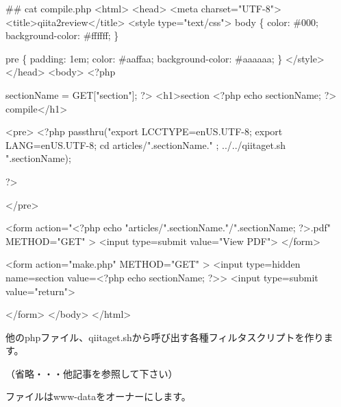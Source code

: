 \begin{reviewemlist}
\#\# cat compile.php
\textless{}html\textgreater{}
\textless{}head\textgreater{}
\textless{}meta charset="UTF{-}8"\textgreater{}
\textless{}title\textgreater{}qiita2review\textless{}/title\textgreater{}
\textless{}style type="text/css"\textgreater{}
body \{
  color: \#000;
  background{-}color: \#ffffff;
\}

pre \{
  padding: 1em;
  color: \#aaffaa;
  background{-}color: \#aaaaaa;
\}
\textless{}/style\textgreater{}
\textless{}/head\textgreater{}
\textless{}body\textgreater{}
\textless{}?php

\textdollar{}sectionName = \textdollar{}\textunderscore{}GET["section"];
?\textgreater{}
\textless{}h1\textgreater{}section \textless{}?php echo \textdollar{}sectionName; ?\textgreater{} compile\textless{}/h1\textgreater{}




\textless{}pre\textgreater{}
\textless{}?php
passthru("export LC\textunderscore{}CTYPE=en\textunderscore{}US.UTF{-}8; export LANG=en\textunderscore{}US.UTF{-}8; cd articles/".\textdollar{}sectionName." ; ../../qiitaget.sh ".\textdollar{}sectionName);


  ?\textgreater{}

\textless{}/pre\textgreater{}

\textless{}form action="\textless{}?php echo "articles/".\textdollar{}sectionName."/".\textdollar{}sectionName; ?\textgreater{}.pdf" METHOD="GET" \textgreater{}
\textless{}input type=submit value="View PDF"\textgreater{}
\textless{}/form\textgreater{}

\textless{}form action="make.php" METHOD="GET" \textgreater{}
\textless{}input type=hidden name=section value=\textless{}?php echo \textdollar{}sectionName; ?\textgreater{}\textgreater{}
\textless{}input type=submit value="return"\textgreater{}


\textless{}/form\textgreater{}
\textless{}/body\textgreater{}
\textless{}/html\textgreater{}

\end{reviewemlist}

他のphpファイル、qiitaget.shから呼び出す各種フィルタスクリプトを作ります。

\begin{reviewemlist}
（省略・・・他記事を参照して下さい）

\end{reviewemlist}

ファイルはwww{-}dataをオーナーにします。

